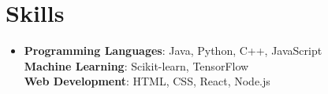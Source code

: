 \documentclass[letterpaper,11pt]{article}
\begin{document}
\section{Skills}
\begin{itemize}[leftmargin=0.15in, label={}]
\item{
\textbf{Programming Languages}{: Java, Python, C++, JavaScript} \\
\textbf{Machine Learning}{: Scikit-learn, TensorFlow} \\
\textbf{Web Development}{: HTML, CSS, React, Node.js}
} \\
\end{itemize}


\end{document}
